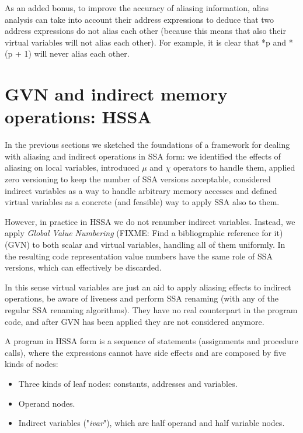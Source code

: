 As an added bonus, to improve the accuracy of aliasing information, alias analysis can take into account their address expressions to deduce that two address expressions do not alias each other (because this means that also their virtual variables will not alias each other).
For example, it is clear that *p and *(p + 1) will never alias each other.


\section{GVN and indirect memory operations: HSSA}


In the previous sections we sketched the foundations of a framework for dealing with aliasing and indirect operations in SSA form: we identified the effects of aliasing on local variables, introduced $\mu$ and $\chi$ operators to handle them, applied zero versioning to keep the number of SSA versions acceptable, considered indirect variables as a way to handle arbitrary memory accesses and defined virtual variables as a concrete (and feasible) way to apply SSA also to them.

However, in practice in HSSA we do not renumber indirect variables.
Instead, we apply {\em Global Value Numbering} (FIXME: Find a bibliographic reference for it) (GVN) to both scalar and virtual variables, handling all of them uniformly. In the resulting code representation value numbers have the same role of SSA versions, which can effectively be discarded.

In this sense virtual variables are just an aid to apply aliasing effects to indirect operations, be aware of liveness and perform SSA renaming (with any of the regular SSA renaming algorithms). They have no real counterpart in the program code, and after GVN has been applied they are not considered anymore.

A program in HSSA form is a sequence of statements (assignments and procedure calls), where the expressions cannot have side effects and are composed by five kinds of nodes:
\begin{itemize}
\item Three kinds of leaf nodes: constants, addresses and variables.
\item Operand nodes.
\item Indirect variables ("{\em ivar}"), which are half operand and half variable nodes.
\end{itemize}

